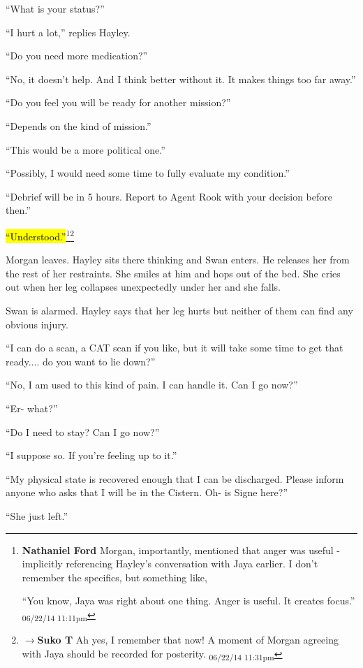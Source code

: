 ``What is your status?'' 

``I hurt a lot,'' replies Hayley.

``Do you need more medication?''

``No, it doesn't help.  And I think better without it.  It makes things too far away.''

``Do you feel you will be ready for another mission?''

``Depends on the kind of mission.''

``This would be a more political one.''

``Possibly, I would need some time to fully evaluate my condition.''

``Debrief will be in 5 hours.  Report to Agent Rook with your decision before then.''

\hl{``Understood.''}\footnote{\textbf{Nathaniel Ford }Morgan, importantly, mentioned that anger was useful - implicitly referencing Hayley's conversation with Jaya earlier. I don't remember the specifics, but something like,

``You know, Jaya was right about one thing. Anger is useful. It creates focus.'' \textsubscript{06/22/14 11:11pm}}\footnote{$\rightarrow$\textbf{Suko T }Ah yes, I remember that now!  A moment of Morgan agreeing with Jaya should be recorded for posterity. \textsubscript{06/22/14 11:31pm}}



Morgan leaves.  Hayley sits there thinking and Swan enters.  He releases her from the rest of her restraints.  She smiles at him and hops out of the bed.  She cries out when her leg collapses unexpectedly under her and she falls.

Swan is alarmed.  Hayley says that her leg hurts but neither of them can find any obvious injury.

``I can do a scan, a CAT scan if you like, but it will take some time to get that ready.... do you want to lie down?''

``No, I am used to this kind of pain.  I can handle it.  Can I go now?''

``Er- what?''

``Do I need to stay?  Can I go now?''

``I suppose so.  If you're feeling up to it.''

``My physical state is recovered enough that I can be discharged.  Please inform anyone who asks that I will be in the Cistern.  Oh- is Signe here?''

``She just left.''

